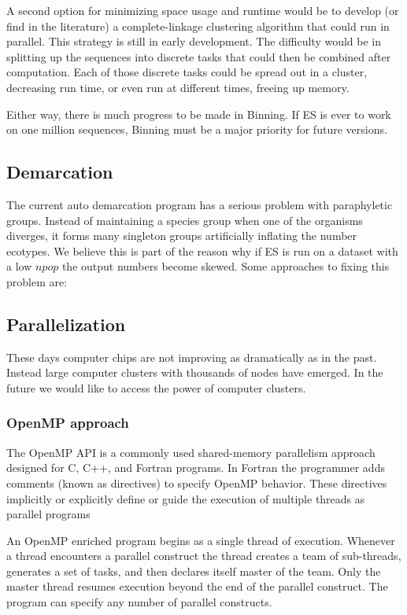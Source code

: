 A second option for minimizing space usage and runtime would be to develop (or find in the literature) a complete-linkage clustering algorithm that could run in parallel.
This strategy is still in early development.
The difficulty would be in splitting up the sequences into discrete tasks that could then be combined after computation.
Each of those discrete tasks could be spread out in a cluster, decreasing run time, or even run at different times, freeing up memory.

Either way, there is much progress to be made in Binning.
If ES is ever to work on one million sequences, Binning must be a major priority for future versions.

\subsection*{Demarcation}
The current auto demarcation program has a serious problem with paraphyletic groups.
Instead of maintaining a species group when one of the organisms diverges, it forms many singleton groups artificially inflating the number ecotypes.
We believe this is part of the reason why if ES is run on a dataset with a low $npop$ the output numbers become skewed.
Some approaches to fixing this problem are:

\subsection*{Parallelization}
These days computer chips are not improving as dramatically as in the past.
Instead large computer clusters with thousands of nodes have emerged.
In the future we would like to access the power of computer clusters.

\subsubsection*{OpenMP approach} %
The OpenMP API is a commonly used shared-memory parallelism approach designed for C, C++, and Fortran programs.
In Fortran the programmer adds comments (known as directives) to specify OpenMP behavior.
These directives implicitly or explicitly define or guide the execution of multiple threads as parallel programs

An OpenMP enriched program begins as a single thread of execution.
Whenever a thread encounters a parallel construct the thread creates a team of sub-threads, generates a set of tasks, and then declares itself master of the team.
Only the master thread resumes execution beyond the end of the parallel construct.
The program can specify any number of parallel constructs.

